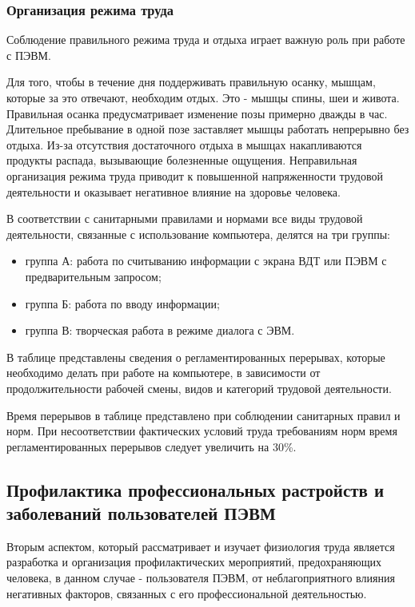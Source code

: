 \subsubsection{Организация режима труда}
Соблюдение правильного режима труда и отдыха играет важную роль при работе с  ПЭВМ.

Для того, чтобы в течение дня поддерживать  правильную осанку, мышцам, которые за это отвечают, необходим отдых. Это - мышцы спины, шеи и живота.                   Правильная осанка предусматривает изменение позы примерно дважды в час. Длительное пребывание в одной позе заставляет мышцы работать непрерывно без отдыха. Из-за отсутствия достаточного отдыха в мышцах накапливаются продукты распада, вызывающие болезненные ощущения. Неправильная организация режима труда приводит к повышенной напряженности трудовой деятельности и оказывает негативное влияние на здоровье человека.

В соответствии с санитарными правилами и нормами  все виды трудовой деятельности, связанные с использование компьютера, делятся на три группы:
\begin{itemize}
\item группа А: работа по считыванию информации с экрана ВДТ или ПЭВМ с предварительным запросом;
\item группа Б: работа по вводу информации;
\item группа В: творческая работа в режиме диалога с ЭВМ.
\end{itemize}

В таблице представлены сведения о регламентированных перерывах, которые необходимо делать при работе на компьютере, в зависимости от продолжительности рабочей смены, видов и категорий трудовой деятельности.

Время перерывов в таблице представлено при соблюдении санитарных правил и норм. При несоответствии фактических условий труда требованиям норм время регламентированных перерывов следует увеличить на 30\%.

\subsection{Профилактика профессиональных  растройств и заболеваний пользователей ПЭВМ}
Вторым аспектом, который рассматривает и изучает физиология труда является разработка и организация профилактических мероприятий, предохраняющих человека, в данном случае - пользователя ПЭВМ, от неблагоприятного влияния негативных факторов, связанных с его профессиональной деятельностью.


